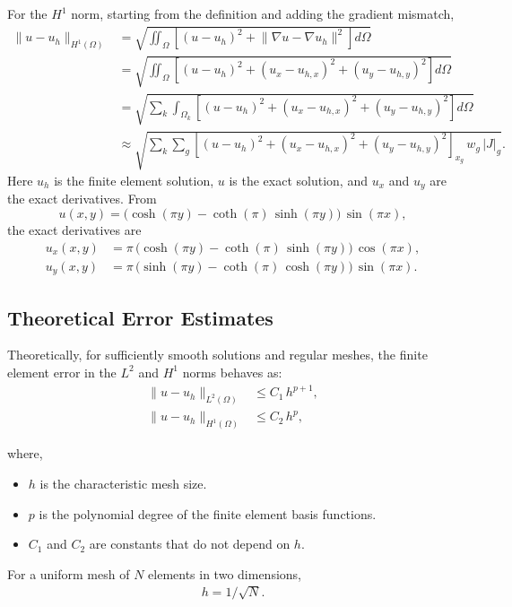 \documentclass[12pt]{article}
\begin{document}
For the $H^1$ norm, starting from the definition and adding the gradient mismatch,
\begin{align}
\lVert u-u_h \rVert_{H^1(\Omega)}
&= \sqrt{ \iint_{\Omega} \left[(u-u_h)^2 + \lVert \nabla u - \nabla u_h \rVert^2\right] d\Omega } \\
&= \sqrt{ \iint_{\Omega} \left[(u-u_h)^2 + (u_x-u_{h,x})^2 + (u_y-u_{h,y})^2\right] d\Omega } \\
&= \sqrt{ \sum_{k} \int_{\Omega_k} \left[(u-u_h)^2 + (u_x-u_{h,x})^2 + (u_y-u_{h,y})^2\right] d\Omega } \\
&\approx \sqrt{ \sum_{k} \sum_{g} \left[(u-u_h)^2 + (u_x-u_{h,x})^2 + (u_y-u_{h,y})^2\right]_{x_g}\, w_g\, |J|_g }.
\end{align}
Here $u_h$ is the finite element solution, $u$ is the exact solution, and $u_x$ and $u_y$ are the exact derivatives. From
\begin{equation}
u(x,y) = \big(\cosh(\pi y) - \coth(\pi)\,\sinh(\pi y)\big)\,\sin(\pi x),
\end{equation}
the exact derivatives are
\begin{align}
u_x(x,y) &= \pi\,\big(\cosh(\pi y) - \coth(\pi)\,\sinh(\pi y)\big)\,\cos(\pi x),\\
u_y(x,y) &= \pi\,\big(\sinh(\pi y) - \coth(\pi)\,\cosh(\pi y)\big)\,\sin(\pi x).
\end{align}

\subsection{Theoretical Error Estimates}
Theoretically, for sufficiently smooth solutions and regular meshes, the finite element error in the $L^2$ and $H^1$ norms behaves as:
\begin{align}
\lVert u-u_h \rVert_{L^2(\Omega)} &\leq C_1\, h^{p+1}, \\
\lVert u-u_h \rVert_{H^1(\Omega)} &\leq C_2\, h^{p},
\end{align}

where,
\begin{itemize}
	\item $h$ is the characteristic mesh size.
	\item $p$ is the polynomial degree of the finite element basis functions.
	\item $C_1$ and $C_2$ are constants that do not depend on $h$.
\end{itemize}
For a uniform mesh of $N$ elements in two dimensions, 
\begin{align}
h = 1/\sqrt{N}.
\end{align}
\end{document}

